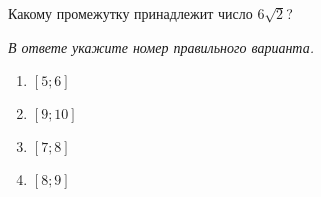 Какому промежутку принадлежит число $6\sqrt{2}$?

\textit{В ответе укажите номер правильного варианта.}
\begin{multicols}{4}
	\begin{enumerate}[label=\arabic*)]
		\item $[5;6]$
		\item $[9;10]$
		\item $[7;8]$
		\item $[8;9]$
	\end{enumerate}
\end{multicols}